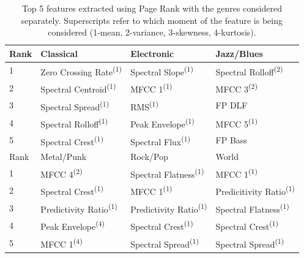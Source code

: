 \documentclass[12pt]{article}
\newcommand{\tss}[1]{\textsuperscript{#1}}
\begin{document}
\begin{table}[!h]
\begin{center}
\begin{tabular}{|l|l|l|l|}
\hline
Rank & Classical & Electronic & Jazz/Blues \\ \hline
1 & Zero Crossing Rate\tss{(1)} & Spectral Slope\tss{(1)} & Spectral Rolloff\tss{(2)} \\ \hline
2 & Spectral Centroid\tss{(1)} & MFCC 1\tss{(1)} & MFCC 3\tss{(2)} \\ \hline
3 & Spectral Spread\tss{(1)} & RMS\tss{(1)} & FP DLF \\ \hline
4 & Spectral Rolloff\tss{(1)} & Peak Envelope\tss{(1)} & MFCC 5\tss{(1)} \\ \hline
5 & Spectral Crest\tss{(1)} & Spectral Flux\tss{(1)} & FP Bass \\ \hline
\hline
Rank & Metal/Punk & Rock/Pop & World \\ \hline
1 & MFCC 4\tss{(2)} & Spectral Flatness\tss{(1)} & MFCC 1\tss{(1)} \\ \hline
2 & Spectral Crest\tss{(1)} & MFCC 1\tss{(1)} & Predicitivity Ratio\tss{(1)} \\ \hline
3 & Predictivity Ratio\tss{(1)} & Predictivity Ratio\tss{(1)} & Spectral Flatness\tss{(1)}\\ \hline
4 & Peak Envelope\tss{(4)} & Spectral Crest\tss{(1)} & Spectral Crest\tss{(1)} \\ \hline
5 & MFCC 1\tss{(4)} & Spectral Spread\tss{(1)} & Spectral Spread\tss{(1)} \\ \hline
\end{tabular}

\caption{Top 5 features extracted using Page Rank with the genres considered separately.  Superscripts refer to which moment of the feature is being considered (1-mean, 2-variance, 3-skewness, 4-kurtosis).}
\label{tab:genre_pr}
\end{center}
\end{table}

\end{document}

